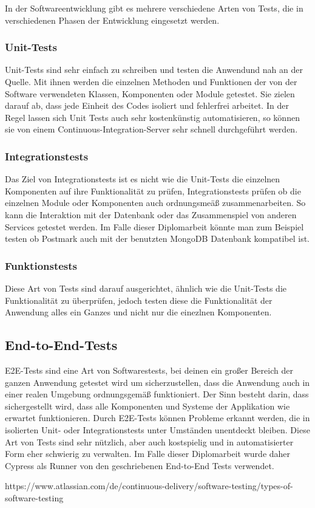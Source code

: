 In der Softwareentwicklung gibt es mehrere verschiedene Arten von Tests, die in verschiedenen Phasen der Entwicklung eingesetzt werden.

\subsubsection{Unit-Tests}
Unit-Tests sind sehr einfach zu schreiben und testen die Anwendund nah an der Quelle. Mit ihnen werden die einzelnen Methoden und Funktionen der von der Software verwendeten Klassen, Komponenten oder Module getestet. Sie zielen darauf ab, dass jede Einheit des Codes isoliert und fehlerfrei arbeitet. In der Regel lassen sich Unit Tests auch sehr kostenkünstig automatisieren, so können sie von einem Continuous-Integration-Server sehr schnell durchgeführt werden.


\subsubsection{Integrationstests}
Das Ziel von Integrationstests ist es nicht wie die Unit-Tests die einzelnen Komponenten auf ihre Funktionalität zu prüfen, Integrationstests prüfen ob die einzelnen Module oder Komponenten auch ordnungsmeäß zusammenarbeiten. So kann die Interaktion mit der Datenbank oder das Zusammenspiel von anderen Services getestet werden. Im Falle dieser Diplomarbeit könnte man zum Beispiel testen ob Postmark auch mit der benutzten MongoDB Datenbank kompatibel ist.

\subsubsection{Funktionstests}
Diese Art von Tests sind darauf ausgerichtet, ähnlich wie die Unit-Tests die Funktionalität zu überprüfen, jedoch testen diese die Funktionalität der Anwendung alles ein Ganzes und nicht nur die einezlnen Komponenten.

\subsection{End-to-End-Tests}
E2E-Tests sind eine Art von Softwarestests, bei deinen ein großer Bereich der ganzen Anwendung getestet wird um sicherzustellen, dass die Anwendung auch in einer realen Umgebung ordnungsgemäß funktioniert. Der Sinn besteht darin, dass sichergestellt wird, dass alle Komponenten und Systeme der Applikation wie erwartet funktionieren. Durch E2E-Tests können Probleme erkannt werden, die in isolierten Unit- oder Integrationstests unter Umständen unentdeckt bleiben. Diese Art von Tests sind sehr nützlich, aber auch kostspielig und in automatisierter Form eher schwierig zu verwalten. Im Falle dieser Diplomarbeit wurde daher Cypress als Runner von den geschriebenen End-to-End Tests verwendet.


\cite{Verschiedene_Testarten}
https://www.atlassian.com/de/continuous-delivery/software-testing/types-of-software-testing
